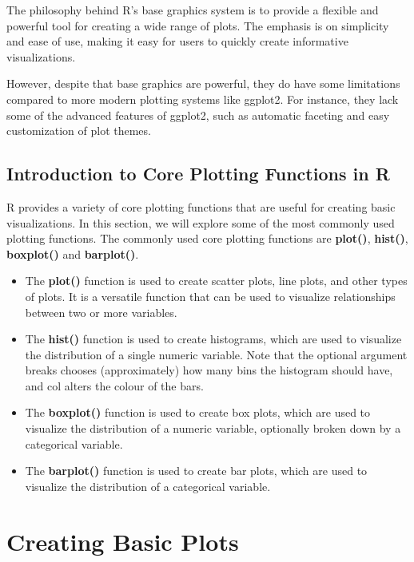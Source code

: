 \documentclass[
]{book}
\providecommand{\tightlist}{%
  \setlength{\itemsep}{0pt}\setlength{\parskip}{0pt}}
\begin{document}
The philosophy behind R's base graphics system is to provide a flexible and powerful tool for creating a wide range of plots. The emphasis is on simplicity and ease of use, making it easy for users to quickly create informative visualizations.

However, despite that base graphics are powerful, they do have some limitations compared to more modern plotting systems like ggplot2. For instance, they lack some of the advanced features of ggplot2, such as automatic faceting and easy customization of plot themes.

\subsection{Introduction to Core Plotting Functions in R}\label{introduction-to-core-plotting-functions-in-r}

R provides a variety of core plotting functions that are useful for creating basic visualizations. In this section, we will explore some of the most commonly used plotting functions. The commonly used core plotting functions are \textbf{plot()}, \textbf{hist()}, \textbf{boxplot()}
and \textbf{barplot()}.

\begin{itemize}
\tightlist
\item
  The \textbf{plot()} function is used to create scatter plots, line plots, and other types of plots. It is a versatile function that can be used to visualize relationships between two or more variables.
\item
  The \textbf{hist()} function is used to create histograms, which are used to visualize the distribution of a single numeric variable. Note that the optional argument breaks chooses (approximately) how many
  bins the histogram should have, and col alters the colour of the bars.
\item
  The \textbf{boxplot()} function is used to create box plots, which are used to visualize the distribution of a numeric variable, optionally broken down by a categorical variable.
\item
  The \textbf{barplot()} function is used to create bar plots, which are used to visualize the distribution of a categorical variable.
\end{itemize}

\section{Creating Basic Plots}\label{creating-basic-plots}
\end{document}
